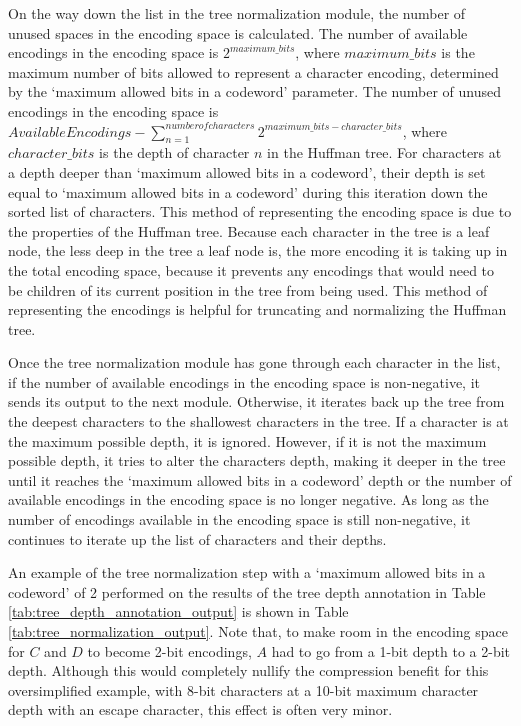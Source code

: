 \documentclass[doublespace,nopageskip]{VTthesis}
\begin{document}
On the way down the list in the tree normalization module, the number of unused spaces in the encoding space is calculated. The number of available encodings in the encoding space is $2^{maximum\_bits}$, where $maximum\_bits$ is the maximum number of bits allowed to represent a character encoding, determined by the `maximum allowed bits in a codeword' parameter. The number of unused encodings in the encoding space is $Available Encodings - \sum_{n=1}^{number of characters}2^{maximum\_bits-character\_bits}$, where $character\_bits$ is the depth of character $n$ in the Huffman tree. For characters at a depth deeper than `maximum allowed bits in a codeword', their depth is set equal to `maximum allowed bits in a codeword' during this iteration down the sorted list of characters. This method of representing the encoding space is due to the properties of the Huffman tree. Because each character in the tree is a leaf node, the less deep in the tree a leaf node is, the more encoding it is taking up in the total encoding space, because it prevents any encodings that would need to be children of its current position in the tree from being used. This method of representing the encodings is helpful for truncating and normalizing the Huffman tree.

Once the tree normalization module has gone through each character in the list, if the number of available encodings in the encoding space is non-negative, it sends its output to the next module. Otherwise, it iterates back up the tree from the deepest characters to the shallowest characters in the tree. If a character is at the maximum possible depth, it is ignored. However, if it is not the maximum possible depth, it tries to alter the characters depth, making it deeper in the tree until it reaches the `maximum allowed bits in a codeword' depth or the number of available encodings in the encoding space is no longer negative. As long as the number of encodings available in the encoding space is still non-negative, it continues to iterate up the list of characters and their depths.

An example of the tree normalization step with a `maximum allowed bits in a codeword' of 2 performed on the results of the tree depth annotation in Table \ref{tab:tree_depth_annotation_output} is shown in Table \ref{tab:tree_normalization_output}. Note that, to make room in the encoding space for $C$ and $D$ to become 2-bit encodings, $A$ had to go from a 1-bit depth to a 2-bit depth. Although this would completely nullify the compression benefit for this oversimplified example, with 8-bit characters at a 10-bit maximum character depth with an escape character, this effect is often very minor.
\end{document}
